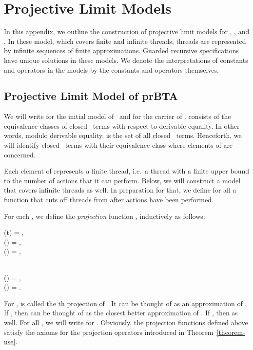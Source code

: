 \documentclass{llncs}
\begin{document}
\appendix

\section{Projective Limit Models}
\label{appendix}

In this appendix, we outline the construction of projective limit models 
for \prBTA, \prTSI, and \prTA.
In these model, which covers finite and infinite threads, threads are
represented by infinite sequences of finite approximations.
Guarded recursive specifications have unique solutions in these models.
We denote the interpretations of constants and operators in the models 
by the constants and operators themselves.

\subsection{Projective Limit Model of prBTA}
\label{app-prBTA}

We will write  for the initial model of \prBTA\ and 
 for the carrier of .
 consists of the equivalence classes of closed \prBTA\ 
terms with respect to derivable equality.
In other words, modulo derivable equality,  is the set of
all closed \prBTA\ terms.
Henceforth, we will identify closed \prBTA\ terms with their equivalence
class where elements of  are concerned.

Each element of  represents a finite thread,  i.e.\ a
thread with a finite upper bound to the number of actions that it can
perform.
Below, we will construct a model that covers infinite threads as well.
In preparation for that, we define for all  a function that cuts off
threads from  after  actions have been performed.

\sloppy
For each , we define the \emph{projection} function
, inductively as 
follows:
\begin{ldispl}
\begin{geqns}
(t) = \DeadEnd\;, 
\\
(\Stop)  = \Stop\;, 
\\
(\DeadEnd) = \DeadEnd\;, 
\\
\end{geqns}
\quad\;\;
\begin{geqns}
{} \\
() = \;,
\\
() = \;.
\end{geqns}
\end{ldispl}For ,  is called the th projection
of .
It can be thought of as an approximation of .
If , then  can be thought of as the
closest better approximation of .
If , then  as well.
For all , we will write  for
.
Obviously, the projection functions defined above satisfy the axioms for 
the projection operators introduced in Theorem~\ref{theorem-use}.
\end{document}
